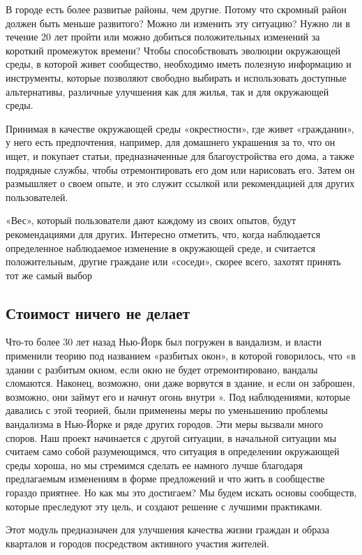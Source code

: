 В городе есть более развитые районы, чем другие. Потому что скромный район должен быть меньше развитого? Можно ли изменить эту ситуацию? Нужно ли в течение 20 лет пройти или можно добиться положительных изменений за короткий промежуток времени?
Чтобы способствовать эволюции окружающей среды, в которой живет сообщество, необходимо иметь полезную информацию и инструменты, которые позволяют свободно выбирать и использовать доступные альтернативы, различные улучшения как для жилья, так и для окружающей среды.

Принимая в качестве окружающей среды «окрестности», где живет «гражданин», у него есть предпочтения, например, для домашнего украшения за то, что он ищет, и покупает статьи, предназначенные для благоустройства его дома, а также подрядные службы, чтобы отремонтировать его дом или нарисовать его. Затем он размышляет о своем опыте, и это служит ссылкой или рекомендацией для других пользователей.

«Вес», который пользователи дают каждому из своих опытов, будут рекомендациями для других. Интересно отметить, что, когда наблюдается определенное наблюдаемое изменение в окружающей среде, и считается положительным, другие граждане или «соседи», скорее всего, захотят принять тот же самый выбор

\subsection{Стоимост ничего не делает}

Что-то более 30 лет назад Нью-Йорк был погружен в вандализм, и власти применили теорию под названием «разбитых окон», в которой говорилось, что «в здании с разбитым окном, если окно не будет отремонтировано, вандалы сломаются. Наконец, возможно, они даже ворвутся в здание, и если он заброшен, возможно, они займут его и начнут огонь внутри ». Под наблюдениями, которые давались с этой теорией, были применены меры по уменьшению проблемы вандализма в Нью-Йорке и ряде других городов. Эти меры вызвали много споров.
Наш проект начинается с другой ситуации, в начальной ситуации мы считаем само собой разумеющимся, что ситуация в определении окружающей среды хороша, но мы стремимся сделать ее намного лучше благодаря предлагаемым изменениям в форме предложений и что жить в сообществе гораздо приятнее. Но как мы это достигаем? Мы будем искать основы сообществ, которые преследуют эту цель, и создают решение с лучшими практиками.

Этот модуль предназначен для улучшения качества жизни граждан и образа кварталов и городов посредством активного участия жителей.

